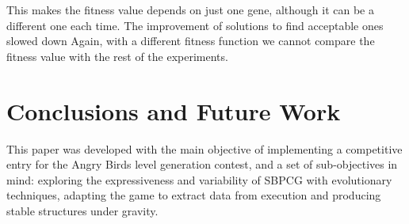 \documentclass[runningheads,a4paper]{llncs}
\begin{document}
This makes the fitness value depends on just one gene, although it can be a
different one each time. The improvement of solutions to find acceptable ones
slowed down %
Again, with a different fitness function we cannot compare the fitness
value with the rest of the experiments. 




%
\section{Conclusions and Future Work} 
\label{sec:conclusions}


This paper was developed with the main objective of implementing a
competitive entry for the Angry Birds level generation contest, and  a
set of sub-objectives in mind: exploring the expressiveness and variability of 
SBPCG with evolutionary techniques, adapting the game to extract data from 
execution and producing stable structures under gravity.
\end{document}
